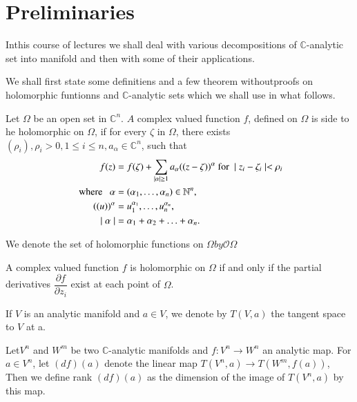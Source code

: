 \chapter{Preliminaries}\label{chap1} %


In\pageoriginale this course of lectures we shall deal with various
decompositions of 
$\mathbb{C}$-analytic set into manifold and then with some of their
applications. 

We shall first state some definitiens and a few theorem without\break proofs
on holomorphic funtionns and $\mathbb{C}$-analytic sets which we shall
use in what follows. 

\begin{definitions}\label{chap1-defins1} 
  Let $\Omega$ be an open set in $\mathbb{C}^n$. $A$ complex valued
  function $f$, defined on $\Omega$ is side to he holomorphic on
  $\Omega$, if for every $\zeta$ in $\Omega$, there exists
  $(\rho_{i}), \rho_{i} > 0, 1 \leq i \leq n, a_{\alpha} \in
  \mathbb{C}^n$, such that 
  \begin{align*}
    f(z) &= f(\zeta) + \sum\limits_{\mid \alpha \mid \geq 1}
    a_{\alpha}((z-\zeta))^{\alpha}~\text{for}~ \mid z_{i}- \zeta_{i}
    \mid < \rho_{i}\\ 
    \text{ \rm where }~~\alpha &= (\alpha_{1}, \ldots , \alpha_{n})
    \in \mathbb{N}^{n},\\ 
    ((u))^{\alpha} &= u^{{\alpha}_{1}}_{1}, \dots , u^{{\alpha}_{n}}_{n},\\
    \mid \alpha \mid &= \alpha_{1} + \alpha_{2} + \ldots + \alpha_{n}. 
  \end{align*}

We denote the set of holomorphic functions on $\Omega by \mathscr{O} \Omega$
\end{definitions}

\begin{theorem}[Hartogs]\label{chap1-thm1} %
  A complex valued function $f$ is holomorphic
  on $\Omega$ if and only if the partial derivatives $\dfrac {\partial
    f}{\partial z_{i}}$ exist at each point of $\Omega$. 
\end{theorem}

If $V$ is an analytic manifold and $a\in V$, we denote by $T(V,a)$
the tangent space to $V$ at a. 

\setcounter{definition}{1}
\begin{definition}\label{chap1-defin2} %
  Let\pageoriginale $V^{n}$ and $W^{m}$ be two $\mathbb{C}$-analytic manifolds and
  $f : V^{n} \rightarrow W^{n}$ an analytic map. For $a \in V^{n}$,
  let $(df)(a)$ denote the linear map $T(V^{n},a) \rightarrow T(W^{m},
  f(a))$, Then we define rank $(df)(a)$ as the dimension of the image
  of $T(V^{n}, a)$ by this map. 
\end{definition}

